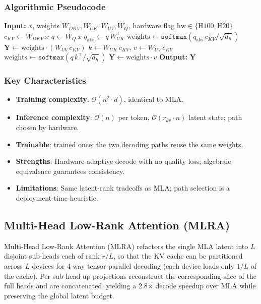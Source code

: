 \subsubsection{Algorithmic Pseudocode}
\begin{algorithmic}[1]
\State \textbf{Input:} $x$, weights $W_{DKV}, W_{UK}, W_{UV}, W_{Q}$, hardware flag $\text{hw} \in \{\text{H100}, \text{H20}\}$
\State $c_{KV} \gets W_{DKV}\, x$ 
\State $q \gets W_{Q}\, x$
 
    \State $q_{\text{abs}} \gets q\, W_{UK}^\top$ 
    \State $\text{weights} \gets \texttt{softmax}(q_{\text{abs}}\, c_{KV}^\top / \sqrt{d_h})$
    \State $\mathbf{Y} \gets \text{weights} \cdot (W_{UV}\, c_{KV})$
\Else {}
    \State $k \gets W_{UK}\, c_{KV}$, \quad $v \gets W_{UV}\, c_{KV}$
    \State $\text{weights} \gets \texttt{softmax}(q\, k^\top / \sqrt{d_h})$
    \State $\mathbf{Y} \gets \text{weights} \cdot v$
\EndIf
\State \textbf{Output:} $\mathbf{Y}$
\end{algorithmic}

\subsubsection{Key Characteristics}
\begin{itemize}[leftmargin=*]
    \item \textbf{Training complexity}: $\mathcal{O}(n^2 \cdot d)$, identical to MLA.
    \item \textbf{Inference complexity}: $\mathcal{O}(n)$ per token, $\mathcal{O}(r_{kv} \cdot n)$ latent state; path chosen by hardware.
    \item \textbf{Trainable}: trained once; the two decoding paths reuse the same weights.
    \item \textbf{Strengths}: Hardware-adaptive decode with no quality loss; algebraic equivalence guarantees consistency.
    \item \textbf{Limitations}: Same latent-rank tradeoffs as MLA; path selection is a deployment-time heuristic.
\end{itemize}

\subsection{Multi-Head Low-Rank Attention (MLRA)}
Multi-Head Low-Rank Attention (MLRA) \citep{liu_mlra_2026} refactors the single MLA latent into $L$ disjoint sub-heads each of rank $r/L$, so that the KV cache can be partitioned across $L$ devices for 4-way tensor-parallel decoding (each device loads only $1/L$ of the cache). Per-sub-head up-projections reconstruct the corresponding slice of the full heads and are concatenated, yielding a 2.8$\times$ decode speedup over MLA while preserving the global latent budget.

